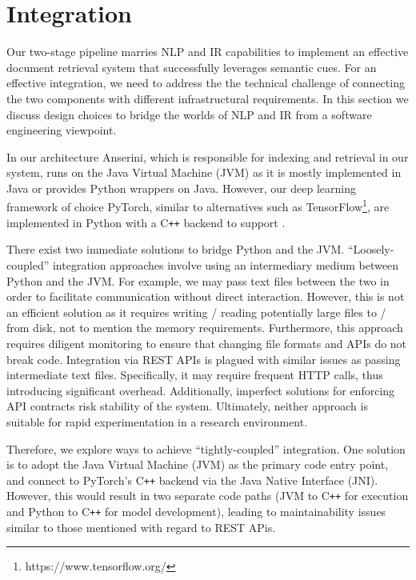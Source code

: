 \section{Integration}

Our two-stage pipeline marries NLP and IR capabilities to implement an effective  document retrieval system that successfully leverages semantic cues.
For an effective integration, we need to address the the technical challenge of connecting the two components with different infrastructural requirements.
In this section we discuss design choices to bridge the worlds of NLP and IR from a software engineering viewpoint.

In our architecture Anserini, which is responsible for indexing and retrieval in our system, runs on the Java Virtual Machine (JVM) as it is mostly implemented in Java or provides Python wrappers on Java.
However, our deep learning framework of choice PyTorch, similar to alternatives such as TensorFlow\footnote{https://www.tensorflow.org/}, are implemented in Python with a C\texttt{++} backend to support .

There exist two immediate solutions to bridge Python and the JVM.
``Loosely-coupled'' integration approaches involve using an intermediary medium between Python and the JVM.
For example, we may pass text files between the two in order to facilitate communication without direct interaction.
However, this is not an efficient solution as it requires writing / reading potentially large files to / from disk, not to mention the memory requirements.
Furthermore, this approach requires diligent monitoring to ensure that changing file formats and APIs do not break code.
Integration via REST APIs is plagued with similar issues as passing intermediate text files.
Specifically, it may require frequent HTTP calls, thus introducing significant overhead.
Additionally, imperfect solutions for enforcing API contracts risk stability of the system.
Ultimately, neither approach is suitable for rapid experimentation in a research environment.

Therefore, we explore ways to achieve ``tightly-coupled'' integration.
One solution is to adopt the Java Virtual Machine (JVM) as the primary code entry point, and connect to PyTorch's C\texttt{++} backend via the Java Native Interface (JNI).
However, this would result in two separate code paths (JVM to C\texttt{++} for execution and Python to C\texttt{++} for model development), leading to maintainability issues similar to those mentioned with regard to REST APis.

